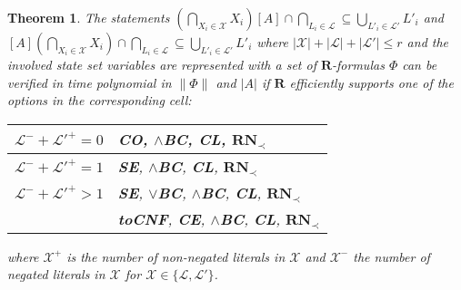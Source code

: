 \documentclass{article}
\newtheorem{theorem}{Theorem}
\newcommand{\ce}{\textbf{CE}}
\newcommand{\se}{\textbf{SE}}
\newcommand{\landbc}{\textbf{$\land$BC}}
\newcommand{\co}{\textbf{CO}}
\newcommand{\rn}{\textbf{RN}}
\newcommand{\cl}{\textbf{CL}}
\newcommand{\lorbc}{\textbf{$\lor$BC}}
\newcommand{\tocnf}{\textbf{toCNF}}
\begin{document}
\begin{theorem}
The statements $(\bigcap_{X_i \in \mathcal X} X_i)[A] \cap \bigcap_{L_i
\in \mathcal L} \subseteq \bigcup_{L'_i \in \mathcal L'} L'_i$ and
$[A](\bigcap_{X_i \in \mathcal X} X_i) \cap \bigcap_{L_i \in \mathcal L}
\subseteq \bigcup_{L'_i \in \mathcal L'} L'_i$ where $|\mathcal X|+|\mathcal
L|+|\mathcal L'| \leq r$ and the involved state set variables are represented
with a set of $\mathbf R$-formulas $\Phi$ can be verified in time polynomial
in $\|\Phi\|$ and $|A|$ if $\mathbf R$ efficiently supports one of the
options in the corresponding cell:

\begin{center}
\begin{tabular}{l|l}
$\mathcal L^- +\mathcal L'^+=0$
 & \co, \landbc, \cl, $\rn_\prec$ \\
\hline
$\mathcal L^- +\mathcal L'^+=1$
 & \se, \landbc, \cl, $\rn_\prec$ \\
\hline
$\mathcal L^- +\mathcal L'^+>1$
 & \se, \lorbc, \landbc, \cl, $\rn_\prec$ \\
 & \tocnf, \ce, \landbc, \cl, $\rn_\prec$ \\
\end{tabular}
\end{center}
where $\mathcal X^+$ is the number of non-negated literals in $\mathcal X$ and
$\mathcal X^-$ the number of negated literals in $\mathcal X$ for $\mathcal
X \in \{\mathcal L, \mathcal L'\}$.
\label{thm:ps-progregverification}
\end{theorem}
\end{document}

